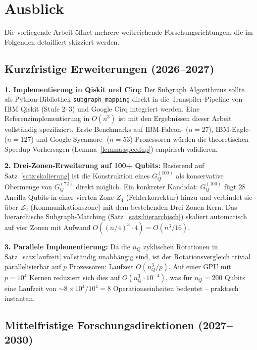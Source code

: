 ﻿\documentclass[a4paper,12pt]{article}
\theoremstyle{definition}
\begin{document}
\section{Ausblick}
\label{sec:ausblick}

Die vorliegende Arbeit öffnet mehrere weitreichende Forschungsrichtungen, die im
Folgenden detailliert skizziert werden.

\subsection{Kurzfristige Erweiterungen (2026--2027)}

\textbf{1. Implementierung in Qiskit und Cirq:}
Der Subgraph Algorithmus sollte als Python-Bibliothek \texttt{subgraph\_mapping}
direkt in die Transpiler-Pipeline von IBM Qiskit (Stufe 2--3) und Google Cirq
integriert werden. Eine Referenzimplementierung in $O(n^3)$ ist mit den
Ergebnissen dieser Arbeit vollständig spezifiziert. Erste Benchmarks auf
IBM-Falcon- ($n = 27$), IBM-Eagle- ($n = 127$) und Google-Sycamore- ($n = 53$)
Prozessoren würden die theoretischen Speedup-Vorhersagen (Lemma~\ref{lemma:speedup})
empirisch validieren.

\textbf{2. Drei-Zonen-Erweiterung auf 100+ Qubits:}
Basierend auf Satz~\ref{satz:skalierung} ist die Konstruktion eines
$G_Q^{(100)}$ als konservative Obermenge von $G_Q^{(72)}$ direkt möglich. Ein
konkreter Kandidat: $G_Q^{(100)}$ fügt 28 Ancilla-Qubits in einer vierten Zone
$Z_4$ (Fehlerkorrektur) hinzu und verbindet sie über $Z_2$ (Kommunikationszone)
mit dem bestehenden Drei-Zonen-Kern. Das hierarchische Subgraph-Matching
(Satz~\ref{satz:hierarchisch}) skaliert automatisch auf vier Zonen mit Aufwand
$O((n/4)^3 \cdot 4) = O(n^3/16)$.

\textbf{3. Parallele Implementierung:}
Da die $n_Q$ zyklischen Rotationen in Satz~\ref{satz:laufzeit} vollständig
unabhängig sind, ist der Rotationsvergleich trivial parallelisierbar auf $p$
Prozessoren: Laufzeit $O(n_Q^3/p)$. Auf einer GPU mit $p = 10^4$ Kernen
reduziert sich dies auf $O(n_Q^3 \cdot 10^{-4})$, was für $n_Q = 200$ Qubits
eine Laufzeit von $\sim 8 \times 10^4 / 10^4 = 8$ Operationseinheiten bedeutet
-- praktisch instantan.

\subsection{Mittelfristige Forschungsdirektionen (2027--2030)}
\end{document}

